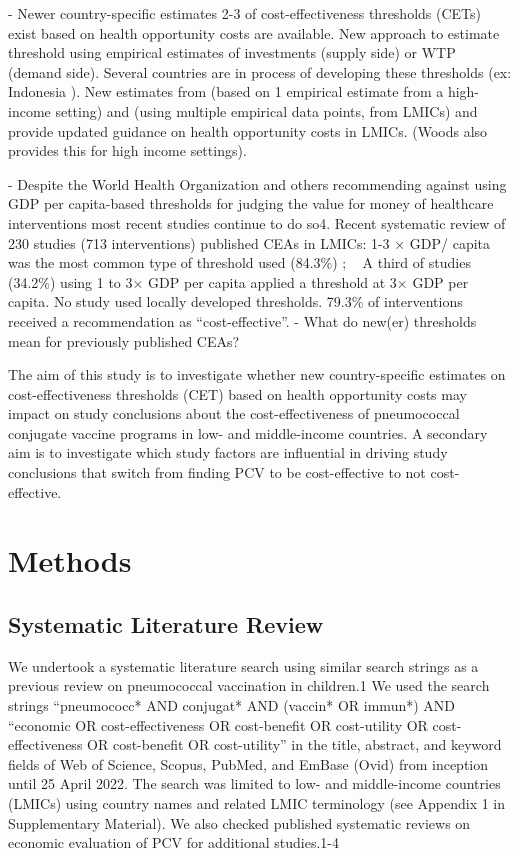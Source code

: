 \documentclass[12pt]{article}
\begin{document}
-	Newer  country-specific estimates 2-3 of cost-effectiveness thresholds (CETs) exist based on health opportunity costs are available. New approach to estimate threshold using empirical estimates of investments (supply side) or WTP (demand side). Several countries are in process of developing these thresholds (ex: Indonesia ). New estimates from \textcite{woods_country-level_2016} (based on 1 empirical estimate from a high-income setting) and \textcite{ochalek_estimating_2018} (using multiple empirical data points, from LMICs) and \textcite{pichon-riviere_determining_2023} provide updated guidance on health opportunity costs in LMICs. (Woods also provides this for high income settings).

-	Despite the World Health Organization and others recommending against using GDP per capita-based thresholds for judging the value for money of healthcare interventions most recent studies continue to do so4. Recent systematic review of 230 studies (713 interventions) published CEAs in LMICs: 1-3 × GDP/ capita was the most common type of threshold used (84.3\%) ; ~ A third of studies (34.2\%) using 1 to 3× GDP per capita applied a threshold at 3× GDP per capita. No study used locally developed thresholds. 79.3\% of interventions received a recommendation as “cost-effective”.
-	What do new(er) thresholds mean for previously published CEAs?  

The aim of this study is to investigate whether new country-specific estimates on cost-effectiveness thresholds (CET) based on health opportunity costs may impact on study conclusions about the cost-effectiveness of pneumococcal conjugate vaccine programs in low- and middle-income countries. A secondary aim is to investigate which study factors are influential in driving study conclusions that switch from finding PCV to be cost-effective to not cost-effective.

\section{Methods}
\subsection{Systematic Literature Review}
We undertook a systematic literature search using similar search strings as a previous review on pneumococcal vaccination in children.1 We used the search strings “pneumococc* AND conjugat* AND (vaccin* OR immun*) AND “economic OR cost-effectiveness OR cost-benefit OR cost-utility OR cost-effectiveness OR cost-benefit OR cost-utility” in the title, abstract, and keyword fields of Web of Science, Scopus, PubMed, and EmBase (Ovid) from inception until 25 April 2022. The search was limited to low- and middle-income countries (LMICs) using country names and related LMIC terminology (see Appendix 1 in Supplementary Material). We also checked published systematic reviews on economic evaluation of PCV for additional studies.1-4
\end{document}

